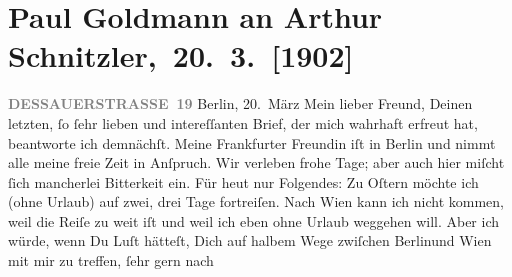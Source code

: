 

         
         \renewcommand{\erwaehntePersonen}{Personen: Richard Beer-Hofmann, Theodore Rottenberg, Olga Schnitzler}
         \renewcommand{\erwaehnteInstitutionen}{Institutionen: Houghton Library}
         \renewcommand{\erwaehnteOrte}{Orte: Berlin, Dessauer Straße, Frankfurt am Main, Prag, Wien}
         \renewcommand{\erwaehnteWerke}{}
               \section[ Paul Goldmann an Arthur Schnitzler, 20. 3. {[}1902{]}]{ Paul Goldmann an Arthur Schnitzler, 20. 3. {[}1902{]}}\nopagebreak{}\rehead{ }\begin{ledgroupsized}[t]{13cm}\normalsize\beginnumbering \toendnotes[C]{\smallbreak\pagebreak[2]} 
\toendnotes[C]{\smallbreak}\pstart
           \noindent{}\raggedleft{}{\pb}\textcolor{gray}{\textbf{DESSAUERSTRASSE 19}}\pend
           \pstart
           Berlin, 20. März\pend
           \pstart{}Mein lieber Freund,\pend\pstart
           Deinen letzten, ſo ſehr lieben und intereſſanten Brief, der mich wahrhaft erfreut
               hat, beantworte ich demnächſt. Meine Frankfurter
                  Freundin iſt in Berlin und nimmt alle meine freie Zeit in Anſpruch. Wir
               verleben frohe Tage; aber auch hier miſcht ſich mancherlei Bitterkeit ein.\pend
           \pstart
           Für heut nur Folgendes: Zu Oſtern möchte ich (ohne
               Urlaub) auf zwei, drei Tage fortreiſen. Nach Wien
               kann ich nicht kommen, weil die Reiſe zu weit iſt und weil ich eben ohne Urlaub
               weggehen will. Aber ich würde, wenn Du Luſt hätteſt, Dich auf halbem Wege zwiſchen
                  Berlinund Wien mit mir
               zu treffen, ſehr gern nach \label{K_L03200-1v}
\end{ledgroupsized}
